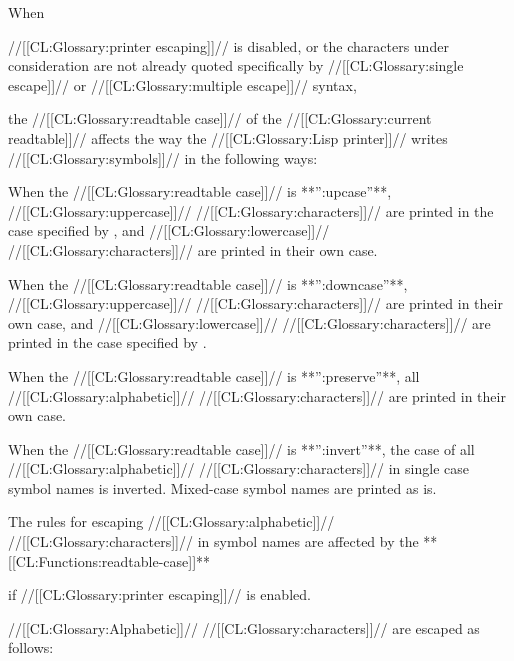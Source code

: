 \endsubsubsubsection%

 


When 

//[[CL:Glossary:printer escaping]]// is disabled, or the characters under consideration are not already  quoted specifically by //[[CL:Glossary:single escape]]// or //[[CL:Glossary:multiple escape]]// syntax,

the //[[CL:Glossary:readtable case]]// of the //[[CL:Glossary:current readtable]]//  affects the way the //[[CL:Glossary:Lisp printer]]// writes //[[CL:Glossary:symbols]]// in the following ways:
  \beginlist {}

 When the //[[CL:Glossary:readtable case]]// is **'':upcase''**,
 //[[CL:Glossary:uppercase]]// //[[CL:Glossary:characters]]//
 are printed in the case specified by , and
 //[[CL:Glossary:lowercase]]// //[[CL:Glossary:characters]]// are printed in their own case.

 When the //[[CL:Glossary:readtable case]]// is **'':downcase''**,
 //[[CL:Glossary:uppercase]]// //[[CL:Glossary:characters]]// are printed in their own case, and
 //[[CL:Glossary:lowercase]]// //[[CL:Glossary:characters]]//
 are printed in the case specified by .

 When the //[[CL:Glossary:readtable case]]// is **'':preserve''**,
 all //[[CL:Glossary:alphabetic]]// //[[CL:Glossary:characters]]// are printed in their own case.

 When the //[[CL:Glossary:readtable case]]// is **'':invert''**,
 the case of all //[[CL:Glossary:alphabetic]]// //[[CL:Glossary:characters]]// 
 in single case symbol names is inverted.
 Mixed-case symbol names are printed as is. \endlist 

The rules for escaping //[[CL:Glossary:alphabetic]]// //[[CL:Glossary:characters]]// in symbol names are affected by the **[[CL:Functions:readtable-case]]**  

if //[[CL:Glossary:printer escaping]]// is enabled.

//[[CL:Glossary:Alphabetic]]// //[[CL:Glossary:characters]]// are escaped as follows:                 \beginlist {}

